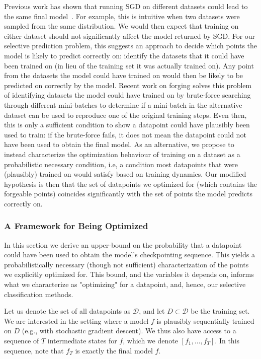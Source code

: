 Previous work has shown that running SGD on different datasets could lead to the same final model~\citep{hardt2016train,bassily2020stability,thudi2022necessity}. For example, this is intuitive when two datasets were sampled from the same distribution. We would then expect that training on either dataset should not significantly affect the model returned by SGD. For our selective prediction problem, this suggests an approach to decide which points the model is likely to predict correctly on: identify the datasets that it could have been trained on (in lieu of the training set it was actually trained on). Any point from the datasets the model could have trained on would then be likely to be predicted on correctly by the model. Recent work on forging \cite{thudi2022necessity} solves this problem of identifying datasets the model could have trained on by brute-force searching through different mini-batches to determine if a mini-batch in the alternative dataset can be used to reproduce one of the original training steps. Even then, this is only a sufficient condition to show a datapoint could have plausibly been used to train: if the brute-force fails, it does not mean the datapoint could not have been used to obtain the final model. As an alternative, we propose to instead characterize the optimization behaviour of training on a dataset as a probabilistic necessary condition, i.e, a condition most datapoints that were (plausibly) trained on would satisfy based on training dynamics. Our modified hypothesis is then that the set of datapoints we optimized for (which contains the forgeable points) coincides significantly with the set of points the model predicts correctly on.


\subsubsection{A Framework for Being Optimized}
\label{ssec:reject_cond}

In this section we derive an upper-bound on the probability that a datapoint could have been used to obtain the model's checkpointing sequence. This yields a probabilistically necessary (though not sufficient) characterization of the points we explicitly optimized for. This bound, and the variables it depends on, informs what we characterize as "optimizing" for a datapoint, and, hence, our selective classification methods.

Let us denote the set of all datapoints as $\mathcal{D}$, and let $D \subset \mathcal{D}$ be the training set. We are interested in the setting where a model $f$ is plausibly sequentially trained on $D$ (e.g., with stochastic gradient descent). We thus also have access to a sequence of $T$ intermediate states for $f$, which we denote $[f_1,\ldots, f_T]$. In this sequence, note that $f_T$ is exactly the final model $f$. 

